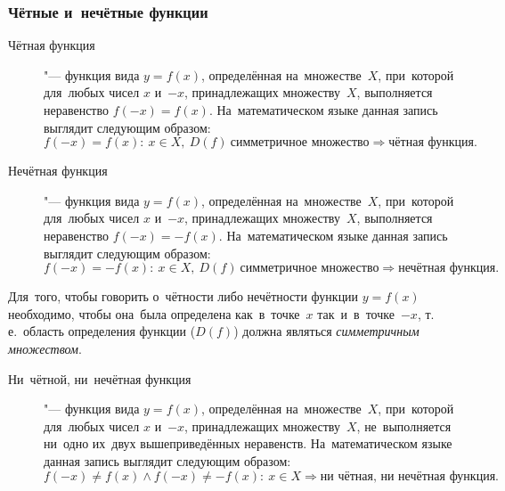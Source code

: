 \documentclass[]{scrartcl}
\begin{document}
{{\subsubsection{Чётные и~нечётные функции}
\begin{description}
	\item[Чётная функция] "--- функция вида ${\textstyle y=f(x)}$, определённая на~множестве~${\textstyle X}$, при~которой для~любых чисел ${\textstyle x}$ и~${\textstyle -x}$, принадлежащих множеству~${\textstyle X}$, выполняется неравенство ${\textstyle f(-x)=f(x)}$. На~математическом языке данная запись выглядит следующим образом:
	\begin{equation}\label{eq:even-functions}
	f(-x)=f(x):\ x\in X,\ D(f)\ \text{симметричное множество} \Rightarrow \text{чётная функция.}
	\end{equation}
\end{description}
\begin{description}
	\item[Нечётная функция] "--- функция вида ${\textstyle y=f(x)}$, определённая на~множестве~${\textstyle X}$, при~которой для~любых чисел ${\textstyle x}$ и~${\textstyle -x}$, принадлежащих множеству~${\textstyle X}$, выполняется неравенство ${\textstyle f(-x)=-f(x)}$. На~математическом языке данная запись выглядит следующим образом:
	\begin{equation}\label{eq:odd-functions}
	f(-x)=-f(x):\ x\in X,\ D(f)\ \text{симметричное множество} \Rightarrow \text{нечётная функция.}
	\end{equation}
\end{description}
Для~того, чтобы говорить о~чётности либо нечётности функции ${\textstyle y=f(x)}$ необходимо, чтобы она~была определена как~в~точке~${\textstyle x}$ так~и~в~точке~${\textstyle -x}$, т.\,е.~область определения функции (${\textstyle D(f)}$) должна являться \emph{симметричным множеством}.
\begin{description}
	\item[Ни~чётной, ни~нечётная функция] "--- функция вида ${\textstyle y=f(x)}$, определённая на~множестве~${\textstyle X}$, при~которой для~любых чисел ${\textstyle x}$ и~${\textstyle -x}$, принадлежащих множеству~${\textstyle X}$, не~выполняется ни~одно их~двух вышеприведённых неравенств. На~математическом языке данная запись выглядит следующим образом:
	\begin{equation}\label{eq:not-even-not-odd-functions}
	f(-x)\neq f(x)\wedge f(-x)\neq-f(x):\ x\in X \Rightarrow \text{ни~чётная, ни~нечётная функция.}
	\end{equation}

\end{description}}}
\end{document}
